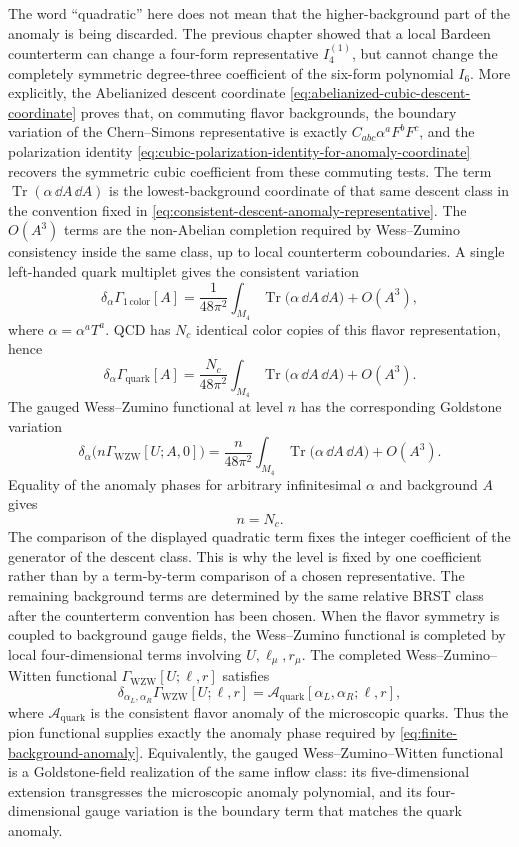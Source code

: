 The word ``quadratic'' here does not mean that the higher-background part of
the anomaly is being discarded.  The previous chapter showed that a local
Bardeen counterterm can change a four-form representative \(I_4^{(1)}\), but
cannot change the completely symmetric degree-three coefficient of the
six-form polynomial \(I_6\).  More explicitly, the Abelianized descent
coordinate \eqref{eq:abelianized-cubic-descent-coordinate} proves that, on
commuting flavor backgrounds, the boundary variation of the Chern--Simons
representative is exactly \(C_{abc}\alpha^aF^bF^c\), and the polarization
identity \eqref{eq:cubic-polarization-identity-for-anomaly-coordinate}
recovers the symmetric cubic coefficient from these commuting tests.  The term
\(\operatorname{Tr}(\alpha\,\dd A\,\dd A)\) is the lowest-background
coordinate of that same descent class in the convention fixed in
\eqref{eq:consistent-descent-anomaly-representative}.  The \(O(A^3)\) terms
are the non-Abelian completion required by Wess--Zumino consistency inside
the same class, up to local counterterm coboundaries.  A single left-handed
quark multiplet gives the consistent variation
\[
  \delta_\alpha\Gamma_{\mathrm{1\,color}}[A]
  =
  \frac1{48\pi^2}
  \int_{M_4}\operatorname{Tr}
  \bigl(\alpha\,\dd A\,\dd A\bigr)
  +O(A^3),
\]
where \(\alpha=\alpha^aT^a\).  QCD has \(N_c\) identical color copies of this
flavor representation, hence
\[
  \delta_\alpha\Gamma_{\mathrm{quark}}[A]
  =
  \frac{N_c}{48\pi^2}
  \int_{M_4}\operatorname{Tr}
  \bigl(\alpha\,\dd A\,\dd A\bigr)
  +O(A^3).
\]
The gauged Wess--Zumino functional at level \(n\) has the corresponding
Goldstone variation
\[
  \delta_\alpha\bigl(n\Gamma_{\mathrm{WZW}}[U;A,0]\bigr)
  =
  \frac{n}{48\pi^2}
  \int_{M_4}\operatorname{Tr}
  \bigl(\alpha\,\dd A\,\dd A\bigr)
  +O(A^3).
\]
Equality of the anomaly phases for arbitrary infinitesimal \(\alpha\) and
background \(A\) gives
\[
  n=N_c .
\]
The comparison of the displayed quadratic term fixes the integer coefficient
of the generator of the descent class.  This is why the level is fixed by
one coefficient rather than by a term-by-term comparison of a chosen
representative.  The remaining background terms are determined by the same
relative BRST class after the counterterm convention has been chosen.  When
the flavor symmetry is coupled to background gauge fields, the Wess--Zumino
functional is completed by local four-dimensional terms involving
\(U,\ell_\mu,r_\mu\).  The completed Wess--Zumino--Witten functional
\(\Gamma_{\mathrm{WZW}}[U;\ell,r]\) satisfies
\[
  \delta_{\alpha_L,\alpha_R}
  \Gamma_{\mathrm{WZW}}[U;\ell,r]
  =
  \mathcal A_{\mathrm{quark}}[\alpha_L,\alpha_R;\ell,r],
\]
where \(\mathcal A_{\mathrm{quark}}\) is the consistent flavor anomaly of the
microscopic quarks.  Thus the pion functional supplies exactly the anomaly
phase required by \eqref{eq:finite-background-anomaly}.  Equivalently, the
gauged Wess--Zumino--Witten functional is a Goldstone-field realization of the
same inflow class: its five-dimensional extension transgresses the microscopic
anomaly polynomial, and its four-dimensional gauge variation is the boundary
term that matches the quark anomaly.

